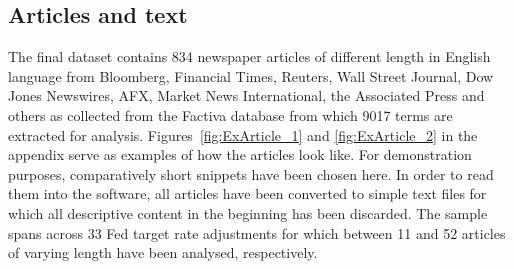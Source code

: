 \subsection{Articles and text}
The final dataset contains 834 newspaper articles of different length in English language from Bloomberg, Financial Times, Reuters, Wall Street Journal, Dow Jones Newswires, AFX, Market News International, the Associated Press and others as collected from the Factiva database from which 9017 terms are extracted for analysis. Figures~\ref{fig:ExArticle_1} and \vref{fig:ExArticle_2} in the appendix serve as examples of how the articles look like. For demonstration purposes, comparatively short snippets have been chosen here. In order to read them into the software, all articles have been converted to simple text files for which all descriptive content in the beginning has been discarded. The sample spans across 33 Fed target rate adjustments for which between 11 and 52 articles of varying length have been analysed, respectively.
%
